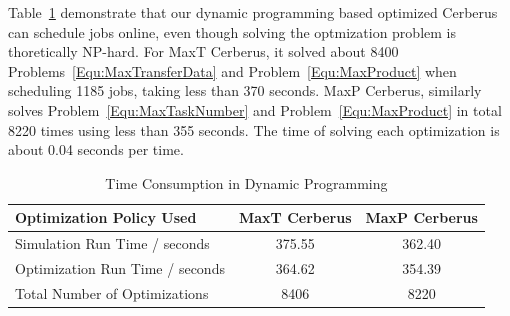 Table~\ref{Tab:OptimizationTime} demonstrate that our dynamic programming based
optimized Cerberus can schedule jobs online,
even though solving the optmization problem is thoretically NP-hard.
For MaxT Cerberus, it solved about 8400 Problems~\ref{Equ:MaxTransferData} and
Problem~\ref{Equ:MaxProduct} when scheduling 1185 jobs, taking less than 370 seconds.
MaxP Cerberus, similarly solves Problem~\ref{Equ:MaxTaskNumber} and
Problem~\ref{Equ:MaxProduct} in total 8220 times using less than 355 seconds.
The time of solving each optimization is about 0.04 seconds per time.

\begin{table}[!t] 
        \renewcommand{\arraystretch}{1.3}
        \caption{Time Consumption in Dynamic Programming}
        \label{Tab:OptimizationTime}
        \centering
        \begin{tabular}{l|c|c}
                \hline
                Optimization Policy Used & MaxT Cerberus & MaxP Cerberus \\
                \hline
                \hline
                Simulation Run Time / seconds & 375.55 & 362.40 \\
                Optimization Run Time / seconds & 364.62 & 354.39 \\
                Total Number of Optimizations & 8406 & 8220 \\
                \hline
        \end{tabular}
\end{table}



